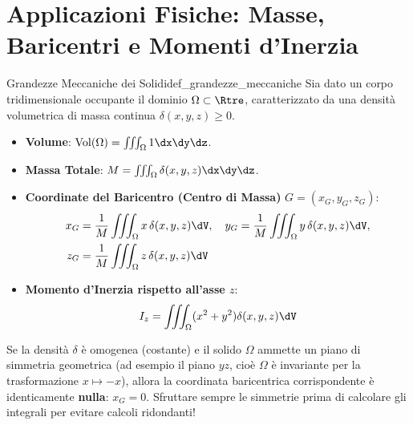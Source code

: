 \section{Applicazioni Fisiche: Masse, Baricentri e Momenti d'Inerzia}

\begin{definizione}{Grandezze Meccaniche dei Solidi}{def_grandezze_meccaniche}
Sia dato un corpo tridimensionale occupante il dominio $\Omega \subset \Rtre$, caratterizzato da una densità volumetrica di massa continua $\delta(x,y,z) \ge 0$.
\begin{itemize}
    \item \textbf{Volume}: $\operatorname{Vol}(\Omega) = \iiint_\Omega 1 \dx\dy\dz$.
    \item \textbf{Massa Totale}: $M = \iiint_\Omega \delta(x,y,z) \dx\dy\dz$.
    \item \textbf{Coordinate del Baricentro (Centro di Massa)} $G = (x_G, y_G, z_G)$:
    \begin{align*}
    x_G &= \frac{1}{M} \iiint_\Omega x \, \delta(x,y,z) \dV, \quad y_G = \frac{1}{M} \iiint_\Omega y \, \delta(x,y,z) \dV, \\
    z_G &= \frac{1}{M} \iiint_\Omega z \, \delta(x,y,z) \dV
    \end{align*}
    \item \textbf{Momento d'Inerzia rispetto all'asse $z$}:
    \[
    I_z = \iiint_\Omega (x^2 + y^2) \delta(x,y,z) \dV
    \]
\end{itemize}
\end{definizione}

\begin{esame}
Se la densità $\delta$ è omogenea (costante) e il solido $\Omega$ ammette un piano di simmetria geometrica (ad esempio il piano $yz$, cioè $\Omega$ è invariante per la trasformazione $x \mapsto -x$), allora la coordinata baricentrica corrispondente è identicamente \textbf{nulla}: $x_G = 0$.
Sfruttare sempre le simmetrie prima di calcolare gli integrali per evitare calcoli ridondanti!
\end{esame}

